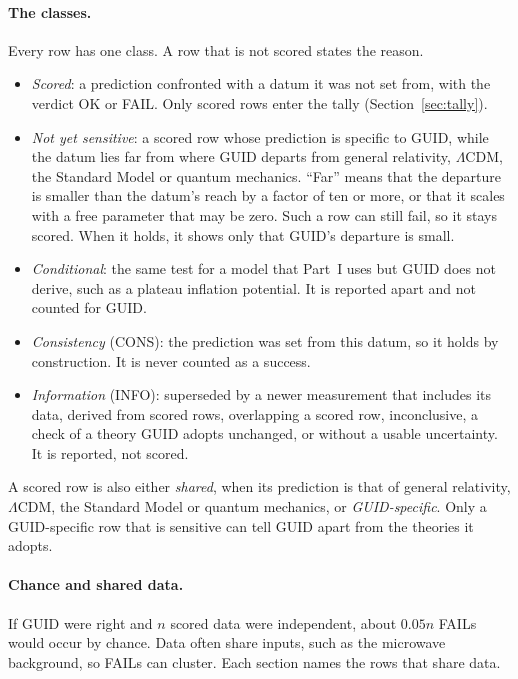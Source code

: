 \paragraph{The classes.} Every row has one class. A row that is not scored states the reason.
\begin{itemize}[nosep,leftmargin=*]
\item \emph{Scored}: a prediction confronted with a datum it was not set from, with the verdict OK or FAIL. Only scored rows enter the tally
(Section~\ref{sec:tally}).
\item \emph{Not yet sensitive}: a scored row whose prediction is specific to GUID, while the datum lies far from where GUID departs from
general relativity, $\Lambda$CDM, the Standard Model or quantum mechanics. ``Far'' means that the departure is smaller than the datum's
reach by a factor of ten or more, or that it scales with a free parameter that may be zero. Such a row can still fail, so it stays scored.
When it holds, it shows only that GUID's departure is small.
\item \emph{Conditional}: the same test for a model that Part~I uses but GUID does not derive, such as a plateau inflation potential.
It is reported apart and not counted for GUID.
\item \emph{Consistency} (CONS): the prediction was set from this datum, so it holds by construction. It is never counted as a success.
\item \emph{Information} (INFO): superseded by a newer measurement that includes its data, derived from scored rows, overlapping a scored
row, inconclusive, a check of a theory GUID adopts unchanged, or without a usable uncertainty. It is reported, not scored.
\end{itemize}
A scored row is also either \emph{shared}, when its prediction is that of general relativity, $\Lambda$CDM, the Standard Model or quantum
mechanics, or \emph{GUID-specific}. Only a GUID-specific row that is sensitive can tell GUID apart from the theories it adopts.

\paragraph{Chance and shared data.} If GUID were right and $n$ scored data were independent, about $0.05n$ FAILs would occur by chance.
Data often share inputs, such as the microwave background, so FAILs can cluster. Each section names the rows that share data.

